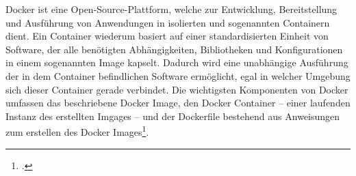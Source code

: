 Docker ist eine Open-Source-Plattform, welche zur Entwicklung, Bereitstellung und Ausführung von Anwendungen in isolierten und sogenannten Containern dient. Ein Container wiederum basiert auf einer standardisierten Einheit von Software, der alle benötigten Abhängigkeiten, Bibliotheken und Konfigurationen in einem sogenannten Image kapselt. Dadurch wird eine unabhängige Ausführung der in dem Container befindlichen Software ermöglicht, egal in welcher Umgebung sich dieser Container gerade verbindet.
Die wichtigsten Komponenten von Docker umfassen das beschriebene Docker Image, den Docker Container – einer laufenden Instanz des erstellten Imgages – und der Dockerfile bestehend aus Anweisungen zum erstellen des Docker Images\footcite{beck_lokale_2023}.